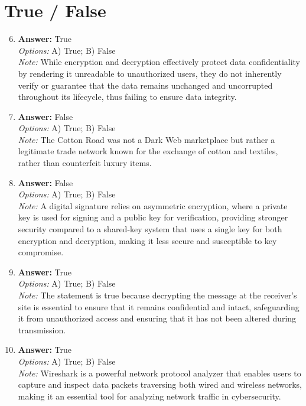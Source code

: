 \documentclass[12pt]{article}
\begin{document}
\section*{True / False}
\begin{enumerate}[label=\arabic*.]
\setcounter{enumi}{5}
\item \textbf{Answer:} True
\\ \textit{Options:} A) True; B) False
\\ \textit{Note:} While encryption and decryption effectively protect data confidentiality by rendering it unreadable to unauthorized users, they do not inherently verify or guarantee that the data remains unchanged and uncorrupted throughout its lifecycle, thus failing to ensure data integrity.
\item \textbf{Answer:} False
\\ \textit{Options:} A) True; B) False
\\ \textit{Note:} The Cotton Road was not a Dark Web marketplace but rather a legitimate trade network known for the exchange of cotton and textiles, rather than counterfeit luxury items.
\item \textbf{Answer:} False
\\ \textit{Options:} A) True; B) False
\\ \textit{Note:} A digital signature relies on asymmetric encryption, where a private key is used for signing and a public key for verification, providing stronger security compared to a shared-key system that uses a single key for both encryption and decryption, making it less secure and susceptible to key compromise.
\item \textbf{Answer:} True
\\ \textit{Options:} A) True; B) False
\\ \textit{Note:} The statement is true because decrypting the message at the receiver's site is essential to ensure that it remains confidential and intact, safeguarding it from unauthorized access and ensuring that it has not been altered during transmission.
\item \textbf{Answer:} True
\\ \textit{Options:} A) True; B) False
\\ \textit{Note:} Wireshark is a powerful network protocol analyzer that enables users to capture and inspect data packets traversing both wired and wireless networks, making it an essential tool for analyzing network traffic in cybersecurity.
\end{enumerate}
\end{document}
